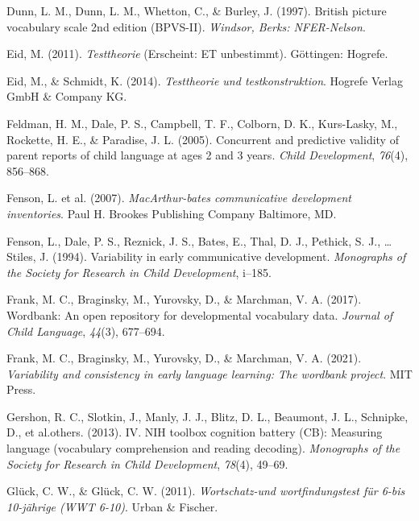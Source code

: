 \documentclass[
  man,floatsintext]{apa6}
\newlength{\cslhangindent}
\newlength{\cslentryspacingunit} %
\newenvironment{CSLReferences}[2] %
 {%
  \setlength{\parindent}{0pt}
  \ifodd #1
  \let\oldpar\par
  \def\par{\hangindent=\cslhangindent\oldpar}
  \fi
  \setlength{\parskip}{#2\cslentryspacingunit}
 }%
 {}
\begin{document}
\begin{CSLReferences}{1}{0}
\leavevmode{}%
Dunn, L. M., Dunn, L. M., Whetton, C., \& Burley, J. (1997). British picture vocabulary scale 2nd edition (BPVS-II). \emph{Windsor, Berks: NFER-Nelson}.

\leavevmode{}%
Eid, M. (2011). \emph{Testtheorie} (Erscheint: ET unbestimmt). Göttingen: Hogrefe.

\leavevmode{}%
Eid, M., \& Schmidt, K. (2014). \emph{Testtheorie und testkonstruktion}. Hogrefe Verlag GmbH \& Company KG.

\leavevmode{}%
Feldman, H. M., Dale, P. S., Campbell, T. F., Colborn, D. K., Kurs-Lasky, M., Rockette, H. E., \& Paradise, J. L. (2005). Concurrent and predictive validity of parent reports of child language at ages 2 and 3 years. \emph{Child Development}, \emph{76}(4), 856--868.

\leavevmode{}%
Fenson, L. et al. (2007). \emph{MacArthur-bates communicative development inventories}. Paul H. Brookes Publishing Company Baltimore, MD.

\leavevmode{}%
Fenson, L., Dale, P. S., Reznick, J. S., Bates, E., Thal, D. J., Pethick, S. J., \ldots{} Stiles, J. (1994). Variability in early communicative development. \emph{Monographs of the Society for Research in Child Development}, i--185.

\leavevmode{}%
Frank, M. C., Braginsky, M., Yurovsky, D., \& Marchman, V. A. (2017). Wordbank: An open repository for developmental vocabulary data. \emph{Journal of Child Language}, \emph{44}(3), 677--694.

\leavevmode{}%
Frank, M. C., Braginsky, M., Yurovsky, D., \& Marchman, V. A. (2021). \emph{Variability and consistency in early language learning: The wordbank project}. MIT Press.

\leavevmode{}%
Gershon, R. C., Slotkin, J., Manly, J. J., Blitz, D. L., Beaumont, J. L., Schnipke, D., et al.others. (2013). IV. NIH toolbox cognition battery (CB): Measuring language (vocabulary comprehension and reading decoding). \emph{Monographs of the Society for Research in Child Development}, \emph{78}(4), 49--69.

\leavevmode{}%
Glück, C. W., \& Glück, C. W. (2011). \emph{Wortschatz-und wortfindungstest f{ü}r 6-bis 10-j{ä}hrige (WWT 6-10)}. Urban \& Fischer.


\end{CSLReferences}
\end{document}
